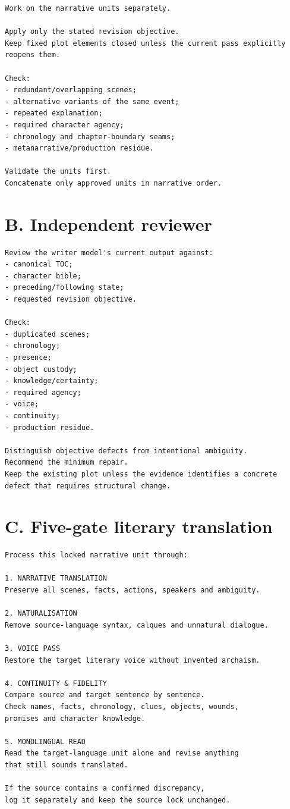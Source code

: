 \documentclass[11pt,oneside,openany]{book}
\begin{document}
\begin{lstlisting}
Work on the narrative units separately.

Apply only the stated revision objective.
Keep fixed plot elements closed unless the current pass explicitly reopens them.

Check:
- redundant/overlapping scenes;
- alternative variants of the same event;
- repeated explanation;
- required character agency;
- chronology and chapter-boundary seams;
- metanarrative/production residue.

Validate the units first.
Concatenate only approved units in narrative order.
\end{lstlisting}

\section{B. Independent reviewer}\label{b.-independent-reviewer}

\begin{lstlisting}
Review the writer model's current output against:
- canonical TOC;
- character bible;
- preceding/following state;
- requested revision objective.

Check:
- duplicated scenes;
- chronology;
- presence;
- object custody;
- knowledge/certainty;
- required agency;
- voice;
- continuity;
- production residue.

Distinguish objective defects from intentional ambiguity.
Recommend the minimum repair.
Keep the existing plot unless the evidence identifies a concrete defect that requires structural change.
\end{lstlisting}

\section{C. Five-gate literary translation}\label{c.-five-gate-literary-translation}

\begin{lstlisting}
Process this locked narrative unit through:

1. NARRATIVE TRANSLATION
Preserve all scenes, facts, actions, speakers and ambiguity.

2. NATURALISATION
Remove source-language syntax, calques and unnatural dialogue.

3. VOICE PASS
Restore the target literary voice without invented archaism.

4. CONTINUITY & FIDELITY
Compare source and target sentence by sentence.
Check names, facts, chronology, clues, objects, wounds,
promises and character knowledge.

5. MONOLINGUAL READ
Read the target-language unit alone and revise anything
that still sounds translated.

If the source contains a confirmed discrepancy,
log it separately and keep the source lock unchanged.
\end{lstlisting}
\end{document}
